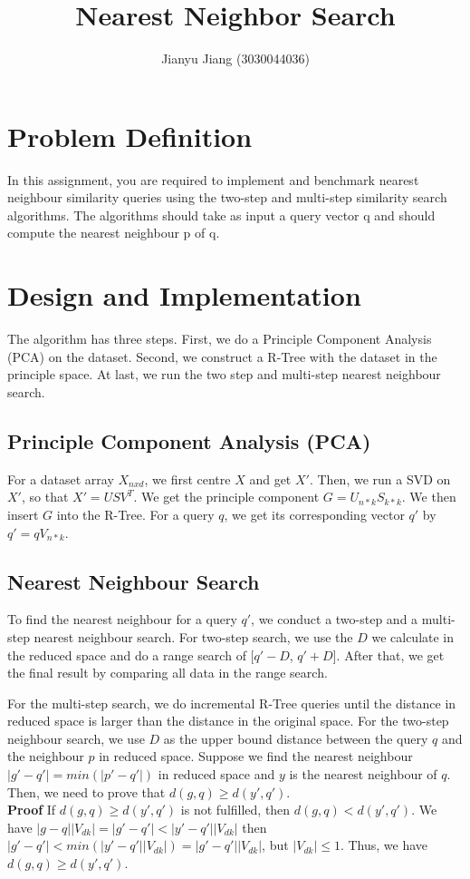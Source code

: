 \documentclass{article}
\title{Nearest Neighbor Search}
\author{Jianyu Jiang (3030044036)}
\begin{document}
\maketitle
\section{Problem Definition}
In this assignment, you are required to implement and benchmark nearest
neighbour similarity queries using
the two-step and multi-step similarity search
algorithms. The algorithms should take as input a query
vector q and should compute the nearest neighbour p of q.

\section{Design and Implementation}
The algorithm has three steps. First, we do a Principle Component Analysis (PCA)
on the dataset. Second, we construct a R-Tree with the dataset in the principle
space. At last, we run the two step and multi-step nearest neighbour search.

\subsection{Principle Component Analysis (PCA)}
For a dataset array $X_{nxd}$, we first centre $X$ and get $X'$. Then,
we run a SVD on $X'$, so that $X' = USV^T$. We get the principle component
$G = U_{n*k}S_{k*k}$. We then insert $G$ into the R-Tree. For a query $q$,
we get its corresponding vector $q'$ by $q' = qV_{n*k}$.


\subsection{Nearest Neighbour Search}
To find the nearest neighbour for a query $q'$, we conduct a two-step and a multi-step
nearest neighbour search. For two-step search, we use the $D$ we calculate in
the reduced space and do a range search of [$q' - D$, $q' + D$]. After that, we
get the final result by comparing all data in the range search.

For the multi-step search, we do incremental R-Tree queries until the distance
in reduced space
is larger than the distance in the original space.
For the two-step neighbour search, we use $D$ as the upper bound distance between
the query $q$ and the neighbour $p$ in reduced space. Suppose we find the nearest
neighbour $ |g' - q'| = min(|p' - q'|)$ in reduced space and $y$ is the nearest neighbour
of $q$. Then, we need to prove that $d(g, q) \geq d(y', q')$. \\
\textbf{Proof} If $d(g, q) \geq d(y', q')$ is not fulfilled, then $d(g, q) < d(y', q')$.
We have
$|g - q||V_{dk}| = |g' - q'| < |y' - q'||V_{dk}|$
then $|g' - q'| < min(|y' - q'||V_{dk}|) = |g' - q'||V_{dk}|$, but
$|V_{dk}| \leq 1$. Thus, we have $d(g, q) \geq d(y', q')$.
\end{document}
